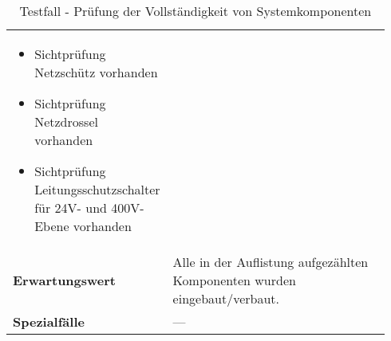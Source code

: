 \documentclass[../../../Bachelorarbeit.tex]{subfiles}
\begin{document}
\begin{table}[H]
\begin{tabular}{ p{0.34\linewidth}  p{0.6\linewidth} }
{\begin{itemize}[noitemsep,topsep=0pt,parsep=0pt,partopsep=0pt,leftmargin=*]
                                                \item Sichtprüfung Netzschütz vorhanden
                                                \item Sichtprüfung Netzdrossel vorhanden
                                                \item Sichtprüfung Leitungsschutzschalter für 24V- und 400V-Ebene vorhanden
                                            \end{itemize}} \\
        \textbf{Erwartungswert}         & Alle in der Auflistung aufgezählten Komponenten wurden eingebaut/verbaut. \\
        \textbf{Spezialfälle}           & --- \\ \hline
    \end{tabular}
    \caption[\acs{tf} - Vollständigkeitsprüfung]{Testfall - Prüfung der Vollständigkeit von Systemkomponenten}
    \label{tab:my-table60}
\end{table}
\end{document}
